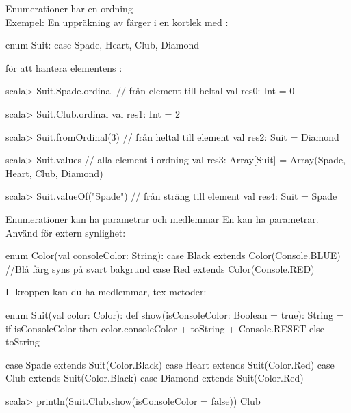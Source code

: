 

\SlideFontSmall
\begin{Slide}{Enumerationer har en ordning}
\ifkompendium \ExplainEnumeration \\Exempel: \fi
En uppräkning av färger i en kortlek med :
\begin{Code}
enum Suit:
  case Spade, Heart, Club, Diamond 
\end{Code}
 för att hantera elementens :\\
\begin{REPLsmall}
scala> Suit.Spade.ordinal      // från element till heltal
val res0: Int = 0

scala> Suit.Club.ordinal
val res1: Int = 2

scala> Suit.fromOrdinal(3)    // från heltal till element
val res2: Suit = Diamond

scala> Suit.values            // alla element i ordning
val res3: Array[Suit] = Array(Spade, Heart, Club, Diamond)

scala> Suit.valueOf("Spade")  // från sträng till element
val res4: Suit = Spade
\end{REPLsmall}
\end{Slide}

\begin{Slide}{Enumerationer kan ha parametrar och medlemmar}
En  kan ha parametrar. Använd  för extern synlighet:  
\begin{Code}
enum Color(val consoleColor: String): 
  case Black extends Color(Console.BLUE) //Blå färg syns på svart bakgrund
  case Red   extends Color(Console.RED)
\end{Code}
I -kroppen kan du ha medlemmar, tex metoder:
\begin{Code}
enum Suit(val color: Color):
  def show(isConsoleColor: Boolean = true): String = 
    if isConsoleColor then color.consoleColor + toString + Console.RESET
    else toString

  case Spade   extends Suit(Color.Black)
  case Heart   extends Suit(Color.Red)
  case Club    extends Suit(Color.Black) 
  case Diamond extends Suit(Color.Red)
\end{Code}
\begin{REPLsmall}
scala> println(Suit.Club.show(isConsoleColor = false)) 
Club
\end{REPLsmall}
\end{Slide}

